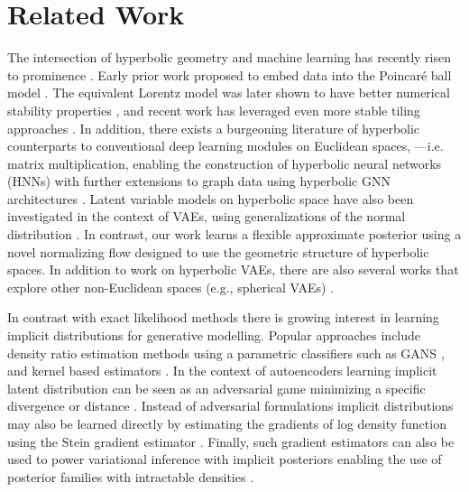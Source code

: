 \section{Related Work}
The intersection of hyperbolic geometry and machine learning has recently risen to prominence \cite{dhingra2018embedding,tay2018hyperbolic,law2019lorentzian,khrulkov2019hyperbolic,ovinnikov2019poincar}. Early prior work proposed to embed data into the Poincar\'e ball model \cite{nickel2017poincare,chamberlain2017neural}.
The equivalent Lorentz model was later shown to have better numerical stability properties \cite{nickel2018learning}, and recent work has leveraged even more stable tiling approaches \cite{yu2019numerically}. 
In addition, there exists a burgeoning literature of hyperbolic counterparts to conventional deep learning modules on Euclidean spaces, ---i.e. matrix multiplication, enabling the construction of hyperbolic neural networks (HNNs) \cite{gulcehre2018hyperbolic,ganea2018hyperbolic} with further extensions to graph data using hyperbolic GNN architectures \cite{liu2019graph,chami2019hyperbolic}.
Latent variable models on hyperbolic space have also been investigated in the context of VAEs, using  generalizations of the normal distribution \cite{nagano2019wrapped,mathieu2019continuous}. In contrast, our work learns a flexible approximate posterior using a novel normalizing flow designed to use the geometric structure of hyperbolic spaces.
In addition to work on hyperbolic VAEs, there are also several works that explore other non-Euclidean spaces (e.g., spherical VAEs) \cite{davidson2018hyperspherical,falorsi2019reparameterizing,grattarola2019adversarial}.

In contrast with exact likelihood methods there is growing interest in learning implicit distributions for generative modelling. Popular approaches include density ratio estimation methods using a parametric classifiers such as GANS \cite{goodfellow2014generative}, and kernel based estimators \cite{shi2017kernel}. In the context of autoencoders learning implicit latent distribution can be seen as an adversarial game minimizing a specific divergence \cite{makhzani2015adversarial} or distance \cite{tolstikhin2017wasserstein}. Instead of adversarial formulations implicit distributions may also be learned directly by estimating the gradients of log density function using the Stein gradient estimator \cite{li2017gradient}. Finally, such gradient estimators can also be used to power variational inference with implicit posteriors enabling the use of posterior families with intractable densities  \cite{shi2018spectral}.

